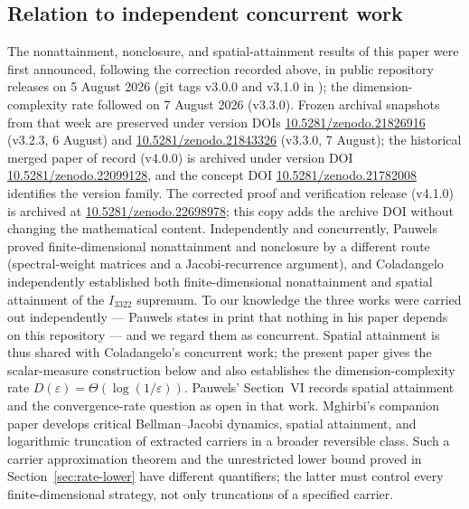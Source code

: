 \documentclass[11pt]{article}
\theoremstyle{remark}
\newcommand{\eps}{\varepsilon}
\begin{document}
\subsection*{Relation to independent concurrent work}

The nonattainment, nonclosure, and spatial-attainment results of this
paper were first announced, following the correction recorded above, in
public repository releases on 5 August
2026 (git tags v3.0.0 and v3.1.0 in \cite{Repo}); the
dimension-complexity rate followed on 7 August 2026 (v3.3.0). Frozen archival snapshots from that week are
preserved under version DOIs
\href{https://doi.org/10.5281/zenodo.21826916}{10.5281/zenodo.21826916}
(v3.2.3, 6 August) and
\href{https://doi.org/10.5281/zenodo.21843326}{10.5281/zenodo.21843326}
(v3.3.0, 7 August); the historical merged paper of record (v4.0.0) is
archived under version DOI
\href{https://doi.org/10.5281/zenodo.22099128}{10.5281/zenodo.22099128},
and the concept DOI
\href{https://doi.org/10.5281/zenodo.21782008}{10.5281/zenodo.21782008}
identifies the version family. The corrected proof and verification release
(v4.1.0) is archived at
\href{https://doi.org/10.5281/zenodo.22698978}{10.5281/zenodo.22698978};
this copy adds the archive DOI without changing the mathematical content.
Independently
and concurrently, Pauwels \cite{Pauwels} proved finite-dimensional
nonattainment and nonclosure by a different route (spectral-weight
matrices and a Jacobi-recurrence argument), and Coladangelo
\cite{Coladangelo2026} independently established both finite-dimensional
nonattainment and spatial attainment of the $I_{3322}$ supremum. To our
knowledge the three works were carried out independently --- Pauwels
states in print that nothing in his paper depends on this repository
--- and we regard them as concurrent.
Spatial attainment is thus shared with Coladangelo's concurrent work;
the present paper gives the scalar-measure construction below and also
establishes the dimension-complexity rate
$D(\eps)=\Theta(\log(1/\eps))$. Pauwels' Section~VI records spatial
attainment and the convergence-rate question as open in that work.
Mghirbi's companion paper \cite{MghirbiDynamics} develops critical
Bellman--Jacobi dynamics, spatial attainment, and logarithmic truncation
of extracted carriers in a broader reversible class. Such a carrier
approximation theorem and the unrestricted lower bound proved in
Section~\ref{sec:rate-lower} have different quantifiers; the latter
must control every finite-dimensional strategy, not only truncations of
a specified carrier.
\end{document}
